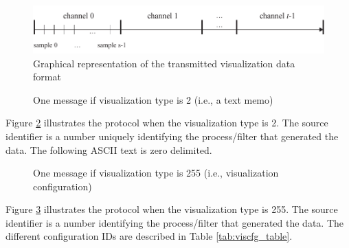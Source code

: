 \documentclass[letterpaper,oneside,12pt]{book}
\begin{document}
\begin{figure}[ht]
 \centerline{\includegraphics{figures/visualization_type1}}
 \caption{Graphical representation of the transmitted visualization data format}
 \label{visualization_type1}
\end{figure}

\begin{figure}[ht]
 \centerline{}
 \caption{One message if visualization type is 2 (i.e., a text memo)}
 \label{visualizationprotocol_type2}
\end{figure}

Figure \ref{visualizationprotocol_type2} illustrates the protocol when the 
visualization type is 2. The source identifier is a number uniquely 
identifying the process/filter that generated the data. The following ASCII
text is zero delimited.

\begin{figure}[ht]
 \centerline{}
 \caption{One message if visualization type is 255 (i.e., visualization configuration)}
 \label{visualizationprotocol_type255}
\end{figure}

Figure \ref{visualizationprotocol_type255} illustrates the protocol when the 
visualization type is 255. The source identifier is a number 
identifying the process/filter that generated the data. The different 
configuration IDs are described in Table \ref{tab:viscfg_table}.
\end{document}

